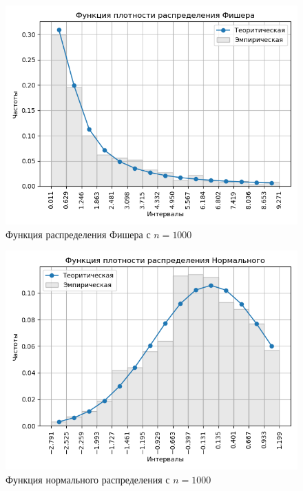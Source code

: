 \documentclass[a4]{article}
\begin{document}
\begin{center}
\begin{figure}[H]
\caption{Функция распределения Фишера с $ n = 1000$}
\includegraphics[width=\textwidth]{output/task1/fisher_1000_histogram.png}
\end{figure}

\begin{figure}[H]
\caption{Функция нормального распределения с $ n = 1000$}
\includegraphics[width=\textwidth]{output/task1/norm_1000_histogram.png}
\end{figure}


\end{center}
\end{document}
